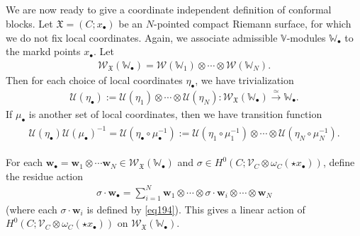 \documentclass[12pt,a4paper,notitlepage]{article}
\theoremstyle{definition}
\theoremstyle{plain}
\newcommand{\fk}{\mathfrak}
\newcommand{\mc}{\mathcal}
\newcommand{\scr}{\mathscr}
\newcommand{\blt}{\bullet}
\newcommand{\Vbb}{\mathbb V}
\newcommand{\Wbb}{\mathbb W}
\newcommand{\wbf}{\mathbf w}
\numberwithin{equation}{section}
\begin{document}
\subsection{}\label{lb124}


We are now ready to give a coordinate independent definition of conformal blocks. Let $\fk X=(C;x_\blt)$ be an $N$-pointed compact Riemann surface, for which we do not fix local coordinates. Again, we associate admissible $\Vbb$-modules $\Wbb_\blt$ to the markd points $x_\blt$. Let  \index{W@$\scr W(\Wbb_i)$, $\scr W_{\fk X}(\Wbb_\blt)$}
\begin{align}
\scr W_{\fk X}(\Wbb_\blt)=\scr W(\Wbb_1)\otimes\cdots\otimes\scr W(\Wbb_N).
\end{align}
Then for each choice of local coordinates $\eta_\blt$, we have trivialization \index{U@$\mc U(\alpha),\mc U(\eta),\mc U(\eta_\blt)$}
\begin{align}
\mc U(\eta_\blt):=\mc U(\eta_1)\otimes\cdots\otimes\mc U(\eta_N):\scr W_{\fk X}(\Wbb_\blt)\xrightarrow{\simeq}\Wbb_\blt.
\end{align}
If $\mu_\blt$ is another set of local coordinates, then we have transition function
\begin{align}\label{eq225}
\begin{aligned}
\mc U(\eta_\blt)\mc U(\mu_\blt)^{-1}=\mc U(\eta_\blt\circ\mu_\blt^{-1}):=\mc U(\eta_1\circ\mu_1^{-1})\otimes\cdots\otimes\mc U(\eta_N\circ\mu_N^{-1}).
\end{aligned}
\end{align}


For each $\wbf_\blt=\wbf_1\otimes\cdots\wbf_N\in\scr W_{\fk X}(\Wbb_\blt)$ and $\sigma\in H^0(C;\scr V_C\otimes\omega_C(\star x_\blt))$, define the residue action
\begin{align}
\sigma\cdot\wbf_\blt=\sum_{i=1}^N \wbf_1\otimes\cdots\otimes \sigma\cdot \wbf_i\otimes\cdots\otimes \wbf_N
\end{align}
(where each $\sigma\cdot \wbf_i$ is defined by \eqref{eq194}). This gives a linear action of $H^0(C;\scr V_C\otimes\omega_C(\star x_\blt))$ on $\scr W_{\fk X}(\Wbb_\blt)$.
\end{document}
